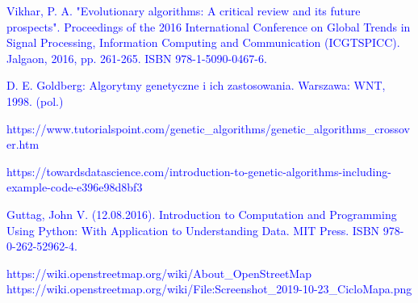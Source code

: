\documentclass[a4paper, twoside, 12pt, justified]{article}
\begin{document}
\begin{thebibliography}{}
		{\hypertarget{evolutionaryalgorithm}{\textcolor{blue}{
		 Vikhar, P. A. "Evolutionary algorithms: A critical review and its future prospects". Proceedings of the 2016 International Conference on Global Trends in Signal Processing, Information Computing and Communication (ICGTSPICC). Jalgaon, 2016, pp. 261-265. ISBN 978-1-5090-0467-6.}}}
	

		
		{\hypertarget{ag}{\textcolor{blue}{
		D. E. Goldberg: Algorytmy genetyczne i ich zastosowania. Warszawa: WNT, 1998. (pol.)}}}
	
		{\hypertarget{cross}{\textcolor{blue}{
		https://www.tutorialspoint.com/genetic\_algorithms/genetic\_algorithms\_crossover.htm}}}
	
		{\hypertarget{mutation}{\textcolor{blue}{
		https://towardsdatascience.com/introduction-to-genetic-algorithms-including-example-code-e396e98d8bf3}}}
	
		{\hypertarget{python}{\textcolor{blue}{
		 Guttag, John V. (12.08.2016). Introduction to Computation and Programming Using Python: With Application to Understanding Data. MIT Press. ISBN 978-0-262-52962-4.}}}
	 
	 	{\hypertarget{osm}{\textcolor{blue}{
		https://wiki.openstreetmap.org/wiki/About\_OpenStreetMap}}}
		{\hypertarget{osm_example}{\textcolor{blue}{
		https://wiki.openstreetmap.org/wiki/File:Screenshot\_2019-10-23\_CicloMapa.png
		}}}

	\end{thebibliography}
	
	
	
\end{document}
